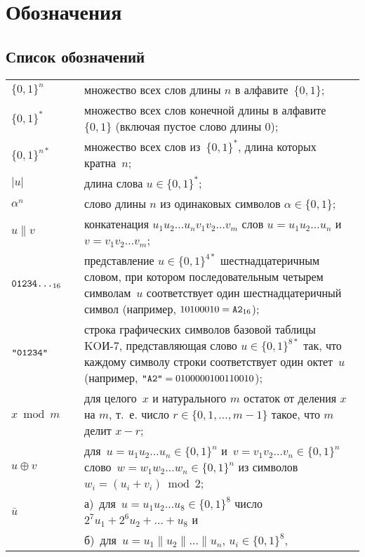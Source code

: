 \chapter{Обозначения}\label{DEFS}

\section{Список обозначений}

{\tabcolsep 0pt
\begin{longtable}{lrp{13.5cm}}
$\{0,1\}^n$  & \hspace{2mm} &
множество всех слов длины $n$ в алфавите~$\{0,1\}$;
\\[4pt]
$\{0,1\}^*$  &&
множество всех слов конечной длины в алфавите~$\{0,1\}$
(включая пустое слово длины $0$);
\\[4pt]
%
$\{0,1\}^{n*}$  &&
множество всех слов из~$\{0,1\}^*$,
длина которых кратна~$n$;
\\[4pt]
%
$|u|$      &&
длина слова $u\in\{0,1\}^*$;
\\[4pt]
%
$\alpha^n$  &&
слово длины $n$ из одинаковых символов $\alpha\in\{0,1\}$;
\\[4pt]
%
$u\parallel v$  &&
конкатенация
$u_1 u_2\ldots u_n v_1 v_2\ldots v_m$
слов
$u=u_1 u_2\ldots u_n$ и
$v=v_1 v_2\ldots v_m$;
\\[4pt]
%
$\texttt{01234\ldots}_{16}$ && 
представление $u\in\{0,1\}^{4*}$ шестнадцатеричным словом,
при котором последовательным четырем символам~$u$ соответствует
один шестнадцатеричный символ
(например, $10100010=\texttt{A2}_{16}$);
\\[4pt]
%
$\texttt{\textquotedbl 01234\textquotedbl}$ && 
строка графических символов базовой таблицы KOИ-7, 
представляющая слово $u\in\{0,1\}^{8*}$ так,
что каждому символу строки соответствует один октет~$u$
(например, $\texttt{\textquotedbl A2\textquotedbl}=0100000100110010$);
\\[4pt]
%
$x\bmod m$             &&
для целого~$x$ и натурального $m$ остаток от деления $x$ на $m$,
т.~е. число $r\in\{0,1,\ldots,m-1\}$ такое, что $m$ делит $x-r$;
\\[4pt]
%
$u\oplus v$             &&
для~$u=u_1 u_2\ldots u_n\in\{0,1\}^n$ 
и~$v=v_1 v_2\ldots v_n\in\{0,1\}^n$
слово~$w=w_1 w_2\ldots w_n\in\{0,1\}^n$
из символов~$w_i=(u_i+v_i)\bmod{2}$;
\\[4pt]
%
$\bar u$                &&
а)~для~$u=u_1 u_2\ldots u_8\in\{0,1\}^8$
число $2^7 u_1+2^6 u_2+\ldots+u_8$ и\\[2pt]
%
                        &&
б)~для~$u=u_1\parallel u_2\parallel\ldots\parallel u_n$, $u_i\in\{0,1\}^8$,

\end{longtable}}
